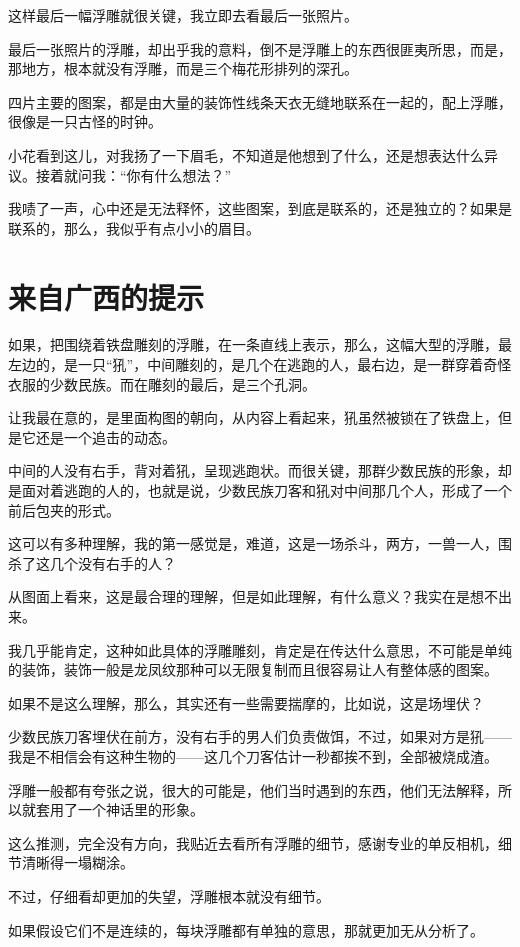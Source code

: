 这样最后一幅浮雕就很关键，我立即去看最后一张照片。

最后一张照片的浮雕，却出乎我的意料，倒不是浮雕上的东西很匪夷所思，而是，那地方，根本就没有浮雕，而是三个梅花形排列的深孔。

四片主要的图案，都是由大量的装饰性线条天衣无缝地联系在一起的，配上浮雕，很像是一只古怪的时钟。

小花看到这儿，对我扬了一下眉毛，不知道是他想到了什么，还是想表达什么异议。接着就问我：“你有什么想法？”

我啧了一声，心中还是无法释怀，这些图案，到底是联系的，还是独立的？如果是联系的，那么，我似乎有点小小的眉目。

\chapter{来自广西的提示}

如果，把围绕着铁盘雕刻的浮雕，在一条直线上表示，那么，这幅大型的浮雕，最左边的，是一只“犼”，中间雕刻的，是几个在逃跑的人，最右边，是一群穿着奇怪衣服的少数民族。而在雕刻的最后，是三个孔洞。

让我最在意的，是里面构图的朝向，从内容上看起来，犼虽然被锁在了铁盘上，但是它还是一个追击的动态。

中间的人没有右手，背对着犼，呈现逃跑状。而很关键，那群少数民族的形象，却是面对着逃跑的人的，也就是说，少数民族刀客和犼对中间那几个人，形成了一个前后包夹的形式。

这可以有多种理解，我的第一感觉是，难道，这是一场杀斗，两方，一兽一人，围杀了这几个没有右手的人？

从图面上看来，这是最合理的理解，但是如此理解，有什么意义？我实在是想不出来。

我几乎能肯定，这种如此具体的浮雕雕刻，肯定是在传达什么意思，不可能是单纯的装饰，装饰一般是龙凤纹那种可以无限复制而且很容易让人有整体感的图案。

如果不是这么理解，那么，其实还有一些需要揣摩的，比如说，这是场埋伏？

少数民族刀客埋伏在前方，没有右手的男人们负责做饵，不过，如果对方是犼——我是不相信会有这种生物的——这几个刀客估计一秒都挨不到，全部被烧成渣。

浮雕一般都有夸张之说，很大的可能是，他们当时遇到的东西，他们无法解释，所以就套用了一个神话里的形象。

这么推测，完全没有方向，我贴近去看所有浮雕的细节，感谢专业的单反相机，细节清晰得一塌糊涂。

不过，仔细看却更加的失望，浮雕根本就没有细节。

如果假设它们不是连续的，每块浮雕都有单独的意思，那就更加无从分析了。

